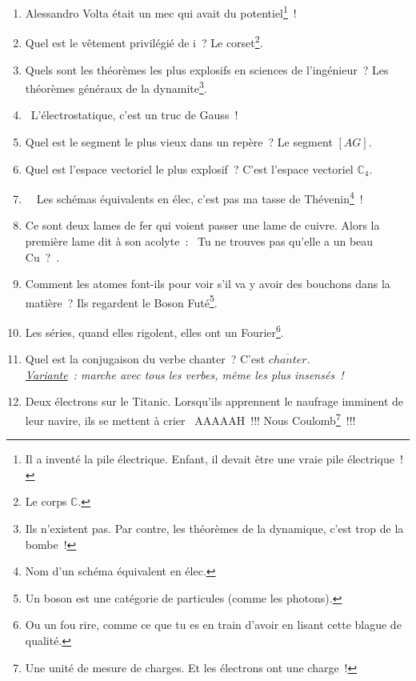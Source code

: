 \documentclass[10pt,a5paper,fullpage]{book}
\begin{document}
\begin{enumerate}
		\item Alessandro Volta était un mec qui avait du potentiel\footnote{Il a inventé la pile électrique. Enfant, il devait être une vraie pile électrique~!}~! 
		\item Quel est le vêtement privilégié de i~? Le corset\footnote{Le corps $\mathbb{C}$.}.
		\item Quels sont les théorèmes les plus explosifs en sciences de l’ingénieur~? Les théorèmes généraux de la dynamite\footnote{Ils n’existent pas. Par contre, les théorèmes de la dynamique, c’est trop de la bombe~!}.
		\item \guillemotleft~L’électrostatique, c’est un truc de Gauss~!~\guillemotright
		\item Quel est le segment le plus vieux dans un repère~? Le segment $[AG]$.
		\item Quel est l’espace vectoriel le plus explosif~? C’est l’espace vectoriel $\mathbb{C}_{4}$.
		\item \guillemotleft~ Les schémas équivalents en élec, c’est pas ma tasse de Thévenin\footnote{Nom d’un schéma équivalent en élec.}~! ~\guillemotright
		\item Ce sont deux lames de fer qui voient passer une lame de cuivre. Alors la première lame dit à son acolyte~: \guillemotleft~Tu ne trouves pas qu’elle a un beau Cu~?~\guillemotright.
		\item Comment les atomes font-ils pour voir s’il va y avoir des bouchons dans la matière~? Ils regardent le Boson Futé\footnote{Un boson est une catégorie de particules (comme les photons).}.
		\item Les séries, quand elles rigolent, elles ont un Fourier\footnote{Ou un fou rire, comme ce que tu es en train d'avoir en lisant cette blague de qualité.}.
		\item Quel est la conjugaison du verbe chanter~? C’est $\overline{chanter}$. \\\textit{\underline{Variante}~: marche avec tous les verbes, même les plus insensés~!}
		\item Deux électrons sur le Titanic. Lorsqu’ils apprennent le naufrage imminent de leur navire, ils se mettent à crier \guillemotleft~AAAAAH~!!! Nous Coulomb\footnote{Une unité de mesure de charges. Et les électrons ont une charge~!}~!!! ~\guillemotright

\end{enumerate}
\end{document}
